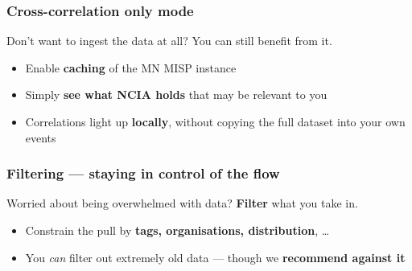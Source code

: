 \begin{frame}
    \frametitle{Cross-correlation only mode}

    Don't want to ingest the data at all? You can still benefit from it.

    \vspace{0.5em}

    \begin{itemize}
        \item Enable \textbf{caching} of the MN MISP instance
        \item Simply \textbf{see what NCIA holds} that may be relevant to you
        \item Correlations light up \textbf{locally}, without copying the full dataset into
              your own events
    \end{itemize}

    \vspace{0.5em}

\end{frame}


\begin{frame}
    \frametitle{Filtering --- staying in control of the flow}

    Worried about being overwhelmed with data? \textbf{Filter} what you take in.

    \vspace{0.5em}

    \begin{itemize}
        \item Constrain the pull by \textbf{tags, organisations, distribution}, \dots
        \item You \emph{can} filter out extremely old data --- though we \textbf{recommend against it}
    \end{itemize}

    \vspace{0.5em}

\end{frame}
